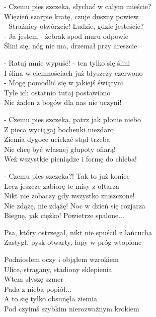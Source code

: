 \begin{text}
    - Czemu pies szczeka, słychać w całym mieście?\\
    Więzień szarpie kratę, czuje duszny powiew\\
    - Strażnicy otwórzcie! Ludzie, gdzie jesteście?\\
    - Ja jestem - żebrak spod muru odpowie\\
    Ślini się, nóg nie ma, drzemał przy areszcie

    - Ratuj mnie wypuść! - ten tylko się ślini\\
    I ślina w ciemnościach już błyszczy czerwono\\
    - Mogę pomodlić się w jakiejś świątyni\\
    Tyle ich ostatnio tutaj postawiono\\
    Nic żaden z bogów dla nas nie uczyni!

    - Czemu pies szczeka, patrz jak płonie niebo\\
    Z pieca wyciągaj bochenki niezdaro\\
    Ziemia dygoce uciekać stąd trzeba\\
    Nie chcę być własnej głupoty ofiarą!\\
    Weź wszystkie pieniądze i formę do chleba!

    - Czemu pies szczeka?! Tak to już koniec\\
    Lecz jeszcze zabiorę te misy z ołtarza\\
    Nikt nie zobaczy gdy wszystko zniszczone!\\
    Nie zdążę, nie zdążę! Noc w dzień się rozjarza\\
    Biegnę, jak ciężko! Powietrze spalone...

    Psa, który ostrzegał, nikt nie spuścił z łańcucha\\
    Zastygł, pysk otwarty, łapy w próg wtopione

    Podniosłem oczy i objąłem wzrokiem\\
    Ulice, stragany, stadiony sklepienia\\
    Wtem słyszę szmer\\
    Pada z nieba popiół...\\
    A to się tylko obsunęła ziemia\\
    Pod czyimś szybkim nierozważnym krokiem
\end{text}

